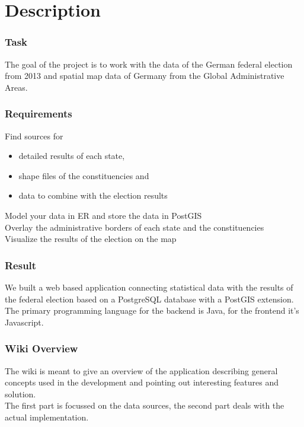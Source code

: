 
\section{Description}

\subsubsection{Task}\label{task}

The goal of the project is to work with the data of the German federal
election from 2013 and spatial map data of Germany from the Global
Administrative Areas.

\subsubsection{Requirements}\label{requirements}

Find sources for
\begin{itemize}
\item
  detailed results of each state,
\item
  shape files of the constituencies and
\item
  data to combine with the election results
\end{itemize}

Model your data in ER and store the data in PostGIS\\Overlay the
administrative borders of each state and the constituencies\\Visualize
the results of the election on the map

\subsubsection{Result}\label{result}

We built a web based application connecting statistical data with the
results of the federal election based on a PostgreSQL database with a
PostGIS extension. The primary programming language for the backend is
Java, for the frontend it's Javascript.

\subsubsection{Wiki Overview}\label{wiki-overview}

The wiki is meant to give an overview of the application describing
general concepts used in the development and pointing out interesting
features and solution.\\The first part is focussed on the data sources,
the second part deals with the actual implementation.
